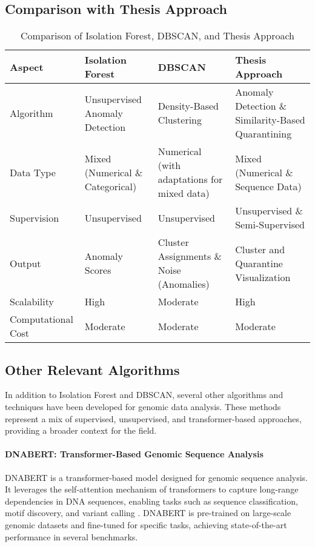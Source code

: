 \subsection{Comparison with Thesis Approach}
\begin{table}[h]
    \centering
    \caption{Comparison of Isolation Forest, DBSCAN, and Thesis Approach}
    \label{tab:comparison}
    \begin{tabular}{|p{2.5cm}|p{2.5cm}|p{2.5cm}|p{2.5cm}|}
    \hline
    \textbf{Aspect} & \textbf{Isolation Forest} & \textbf{DBSCAN} & \textbf{Thesis Approach} \\ \hline
    Algorithm & Unsupervised Anomaly Detection & Density-Based Clustering & Anomaly Detection \& Similarity-Based Quarantining \\ \hline
    Data Type & Mixed (Numerical \& Categorical) & Numerical (with adaptations for mixed data) & Mixed (Numerical \& Sequence Data) \\ \hline
    Supervision & Unsupervised & Unsupervised & Unsupervised \& Semi-Supervised \\ \hline
    Output & Anomaly Scores & Cluster Assignments \& Noise (Anomalies) & Cluster and Quarantine Visualization \\ \hline
    Scalability & High & Moderate & High \\ \hline
    Computational Cost & Moderate & Moderate & Moderate \\ \hline
    \end{tabular}
\end{table}


\subsection{Other Relevant Algorithms}
In addition to Isolation Forest and DBSCAN, several other algorithms and techniques have been developed for genomic data analysis. These methods represent a mix of supervised, unsupervised, and transformer-based approaches, providing a broader context for the field.

\paragraph{DNABERT: Transformer-Based Genomic Sequence Analysis}
DNABERT is a transformer-based model designed for genomic sequence analysis. It leverages the self-attention mechanism of transformers to capture long-range dependencies in DNA sequences, enabling tasks such as sequence classification, motif discovery, and variant calling \cite{ji2021dnabert}. DNABERT is pre-trained on large-scale genomic datasets and fine-tuned for specific tasks, achieving state-of-the-art performance in several benchmarks.

